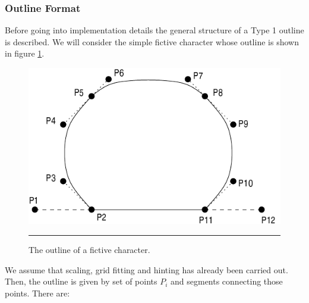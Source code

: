 \subsubsection{Outline Format}
\label{outlineformat}%
Before going into implementation details the general structure of a Type 1
outline is described. We will consider the simple fictive character whose
outline is shown in figure \ref{figure:generaloutline}. 
\begin{figure}[t]
\hfill
\includegraphics[scale=1.0]{outlines}
\hfill\break
\vskip3mm
\hrule\vskip3mm\small
\caption{\label{figure:generaloutline}The outline of a fictive character.} 
\end{figure}
We assume that scaling, grid fitting and hinting has already been carried out.
Then, the outline is given by set of points $P_i$ and segments connecting those
points. There are:
